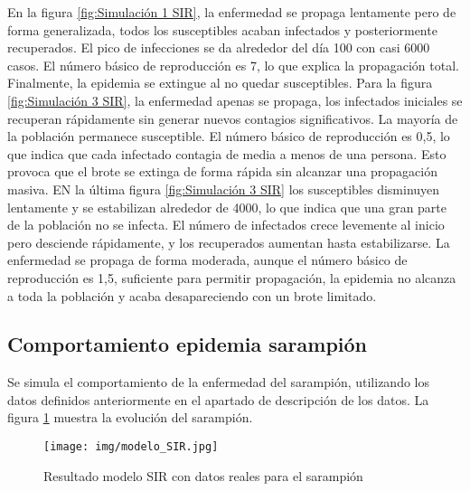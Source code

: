 En la figura \ref{fig:Simulación 1 SIR}, la enfermedad se propaga lentamente pero de forma generalizada, todos los susceptibles acaban infectados y posteriormente recuperados. El pico de infecciones se da alrededor del día 100 con casi 6000 casos. El número básico de reproducción es 7, lo que explica la propagación total. Finalmente, la epidemia se extingue al no quedar susceptibles.
Para la figura \ref{fig:Simulación 3 SIR}, la enfermedad apenas se propaga, los infectados iniciales se recuperan rápidamente sin generar nuevos contagios significativos. La mayoría de la población permanece susceptible. El número básico de reproducción es 0,5, lo que indica que cada infectado contagia de media a menos de una persona. Esto provoca que el brote se extinga de forma rápida sin alcanzar una propagación masiva.
EN la última figura \ref{fig:Simulación 3 SIR} los susceptibles disminuyen lentamente y se estabilizan alrededor de 4000, lo que indica que una gran parte de la población no se infecta. El número de infectados crece levemente al inicio pero desciende rápidamente, y los recuperados aumentan hasta estabilizarse. La enfermedad se propaga de forma moderada, aunque el número básico de reproducción es 1,5, suficiente para permitir propagación, la epidemia no alcanza a toda la población y acaba desapareciendo con un brote limitado.

\subsection{Comportamiento epidemia sarampión}
Se simula el comportamiento de la enfermedad del sarampión, utilizando los datos definidos anteriormente en el apartado de descripción de los datos. La figura \ref{fig:simusara} muestra la evolución del sarampión.

\begin{figure}[H]
    \centering
    \texttt{[image: img/modelo\_SIR.jpg]}
    \caption{Resultado modelo SIR con datos reales para el sarampión}
    \label{fig:simusara}
    \vspace{0.5cm} %
\end{figure}

